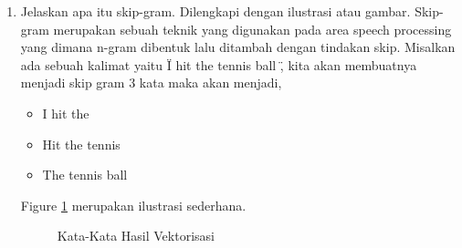 \begin{enumerate}
\item Jelaskan apa itu skip-gram. Dilengkapi dengan ilustrasi atau gambar.
	\subitem Skip-gram merupakan sebuah teknik yang digunakan pada area speech processing yang dimana n-gram dibentuk lalu ditambah dengan tindakan skip. Misalkan ada sebuah kalimat yaitu \" I hit the tennis ball \", kita akan membuatnya menjadi skip gram 3 kata maka akan menjadi,
		\begin{itemize}
			\item I hit the
			\item Hit the tennis
			\item The tennis ball
		\end{itemize}
Figure \ref{YNC5-4} merupakan ilustrasi sederhana.
		\begin{figure}[ht]
		\caption{Kata-Kata Hasil Vektorisasi}
		\label{YNC5-4}
	\end{figure}

\end{enumerate}

